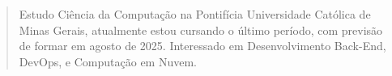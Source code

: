 \begin{quote}
    Estudo Ciência da Computação na Pontifícia Universidade Católica de Minas Gerais, atualmente estou cursando o último período, com previsão de formar em agosto de 2025. Interessado em Desenvolvimento Back-End, DevOps, e Computação em Nuvem.
\end{quote}